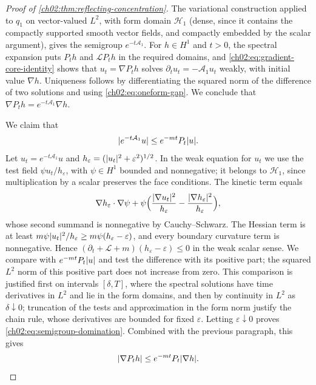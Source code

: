\begin{proof}[Proof of \cref{ch02:thm:reflecting-concentration}]
The variational construction applied to $q_1$ on vector-valued $L^2$, with form domain $\mathcal H_1$ (dense, since it contains the compactly supported smooth vector fields, and compactly embedded by the scalar argument), gives the semigroup $e^{-t\mathcal A_1}$. For $h\in H^1$ and $t>0$, the spectral expansion puts $P_th$ and $\mathcal LP_th$ in the required domains, and \eqref{ch02:eq:gradient-core-identity} shows that $u_t=\nabla P_th$ solves $\partial_tu_t=-\mathcal A_1u_t$ weakly, with initial value $\nabla h$. Uniqueness follows by differentiating the squared norm of the difference of two solutions and using \eqref{ch02:eq:oneform-gap}. We conclude that $\nabla P_th=e^{-t\mathcal A_1}\nabla h$.

We claim that
\begin{equation}\label{ch02:eq:semigroup-domination}
 \lvert e^{-t\mathcal A_1}u\rvert\le e^{-mt}P_t\lvert u\rvert.
\end{equation}
Let $u_t=e^{-t\mathcal A_1}u$ and $h_\varepsilon=(\lvert u_t\rvert^2+\varepsilon^2)^{1/2}$. In the weak equation for $u_t$ we use the test field $\psi u_t/h_\varepsilon$, with $\psi\in H^1$ bounded and nonnegative; it belongs to $\mathcal H_1$, since multiplication by a scalar preserves the face conditions. The kinetic term equals
\[
 \nabla h_\varepsilon\cdot\nabla\psi+\psi\Bigl(\frac{\lvert \nabla u_t\rvert^2}{h_\varepsilon}-\frac{\lvert \nabla h_\varepsilon\rvert^2}{h_\varepsilon}\Bigr),
\]
whose second summand is nonnegative by Cauchy--Schwarz. The Hessian term is at least $m\psi\lvert u_t\rvert^2/h_\varepsilon\ge m\psi(h_\varepsilon-\varepsilon)$, and every boundary curvature term is nonnegative. Hence $(\partial_t+\mathcal L+m)(h_\varepsilon-\varepsilon)\le0$ in the weak scalar sense. We compare with $e^{-mt}P_t\lvert u\rvert$ and test the difference with its positive part; the squared $L^2$ norm of this positive part does not increase from zero. This comparison is justified first on intervals $[\delta,T]$, where the spectral solutions have time derivatives in $L^2$ and lie in the form domains, and then by continuity in $L^2$ as $\delta\downarrow0$; truncation of the tests and approximation in the form norm justify the chain rule, whose derivatives are bounded for fixed $\varepsilon$. Letting $\varepsilon\downarrow0$ proves \eqref{ch02:eq:semigroup-domination}. Combined with the previous paragraph, this gives
\[
 \lvert \nabla P_th\rvert\le e^{-mt}P_t\lvert \nabla h\rvert.
\]


\end{proof}

